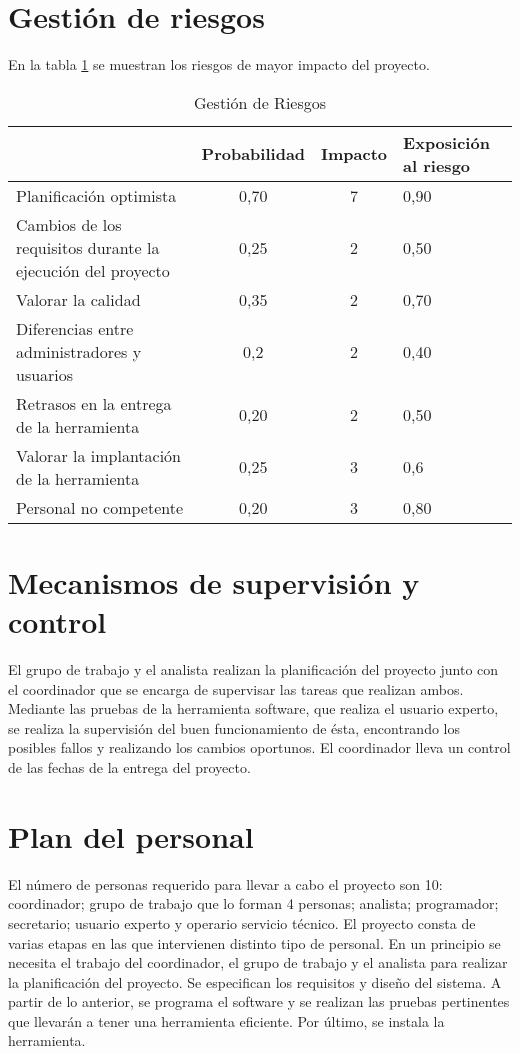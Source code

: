 \documentclass[11pt,a4paper,spanish,twoside]{report}
\begin{document}
\section{Gestión de riesgos}
En la tabla \ref{Tab:GestRi} se muestran los riesgos de mayor impacto del
proyecto. 
\begin{table}[!h]
  \centering
  \begin{tabular}{p{4.5cm}|c|c|b{2cm}<{\centering}}
    & \textbf{Probabilidad} & \textbf{Impacto} & \textbf{Exposición al riesgo}\\
    \hline \hline
    Planificación optimista 
    & 0,70 & 7 & 0,90 \\ \hline
    Cambios de los requisitos durante la ejecución del proyecto 
    & 0,25 & 2 & 0,50 \\ \hline
    Valorar la calidad & 0,35 & 2 & 0,70 \\ \hline
    Diferencias entre administradores y usuarios & 0,2 & 2 & 0,40 \\ \hline
    Retrasos en la entrega de la herramienta & 0,20 & 2 & 0,50 \\ \hline
    Valorar la implantación de la herramienta & 0,25 & 3 & 0,6 \\ \hline
    Personal no competente & 0,20 & 3 & 0,80 \\ \hline
  \end{tabular}
  \caption{Gestión de Riesgos} \label{Tab:GestRi}
\end{table}

\section{Mecanismos de supervisión y control}
El grupo de trabajo y el analista realizan la planificación del proyecto
junto con el coordinador que se encarga de supervisar las tareas que realizan 
ambos.
Mediante las pruebas de la herramienta software, que realiza el usuario
experto, se realiza la supervisión del buen funcionamiento de ésta,
encontrando los posibles fallos y realizando los cambios oportunos. 
El coordinador lleva un control de las fechas de la entrega del proyecto.

\section{Plan del personal}
El número de personas requerido para llevar a cabo el proyecto son 10:
coordinador; grupo de trabajo que lo forman 4 personas; analista;
programador; secretario; usuario experto y operario servicio técnico. 
El proyecto consta de varias etapas en las que intervienen distinto tipo de
personal. En un principio se necesita el trabajo del coordinador, el grupo
de trabajo y el analista para realizar la planificación del proyecto. Se
especifican los requisitos y diseño del sistema. A partir de lo anterior, se
programa el software y se realizan las pruebas pertinentes que llevarán a
tener una herramienta eficiente. Por último, se instala la herramienta.
\end{document}
